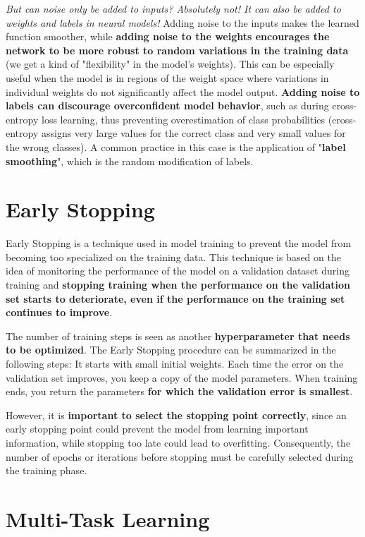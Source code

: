 \textit{But can noise only be added to inputs? Absolutely not! It can also be added to weights and labels in neural models!} Adding noise to the inputs makes the learned function smoother, while \textbf{adding noise to the weights encourages the network to be more robust to random variations in the training data} (we get a kind of "flexibility" in the model's weights). This can be especially useful when the model is in regions of the weight space where variations in individual weights do not significantly affect the model output. \textbf{Adding noise to labels can discourage overconfident model behavior}, such as during cross-entropy loss learning, thus preventing overestimation of class probabilities (cross-entropy assigns very large values for the correct class and very small values for the wrong classes). A common practice in this case is the application of "\textbf{label smoothing}", which is the random modification of labels.

\section{Early Stopping}

Early Stopping is a technique used in model training to prevent the model from becoming too specialized on the training data. 
This technique is based on the idea of monitoring the performance of the model on a validation dataset during training and \textbf{stopping training when the performance on the validation set starts to deteriorate, even if the performance on the training set continues to improve}.

The number of training steps is seen as another \textbf{hyperparameter that needs to be optimized}. The Early Stopping procedure can be summarized in the following steps: It starts with small initial weights. Each time the error on the validation set improves, you keep a copy of the model parameters. When training ends, you return the parameters \textbf{for which the validation error is smallest}.

However, it is \textbf{important to select the stopping point correctly}, since an early stopping point could prevent the model from learning important information, while stopping too late could lead to overfitting. Consequently, the number of epochs or iterations before stopping must be carefully selected during the training phase.

\section{Multi-Task Learning}


